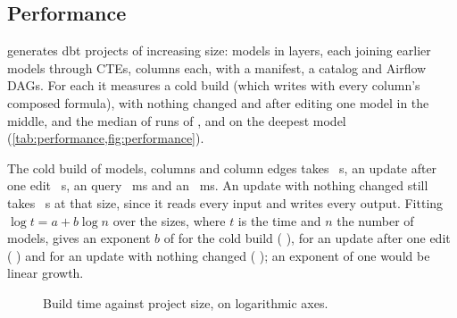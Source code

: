 \subsection{Performance}
\label{sec:eval-performance}

 generates dbt projects of increasing size: models in layers,
each joining earlier models through CTEs, \perfColumnsPerModel{} columns each, with a manifest,
a catalog and Airflow DAGs. For each it measures a cold build (which writes  with
every column's composed formula),  with nothing changed and after editing one model
in the middle, and the median of \perfQueryRuns{} runs of ,  and  on the
deepest model (\cref{tab:performance,fig:performance}).

The cold build of \perfLargestModels{} models, \perfLargestColumns{} columns and
\perfLargestEdges{} column edges takes \perfLargestCold{}~s, an update after one edit
\perfLargestUpdate{}~s, an  query \perfLargestImpact{}~ms and an 
\perfLargestExplain{}~ms. An update with nothing changed still takes \perfLargestUnchanged{}~s at
that size, since it reads every input and writes every output. Fitting $\log t = a + b \log n$
over the \perfSizes{} sizes, where $t$ is the time and $n$ the number of models, gives an exponent
$b$ of \perfExponentCold{} for the cold build (\rsq{} \perfExponentColdFit{}), \perfExponentUpdate{}
for an update after one edit (\rsq{} \perfExponentUpdateFit{}) and \perfExponentUnchanged{} for an
update with nothing changed (\rsq{} \perfExponentUnchangedFit{}); an exponent of one would be linear
growth.

\begin{figure}[t]
\centering
{}
\caption{Build time against project size, on logarithmic axes.}
\label{fig:performance}
\end{figure}

